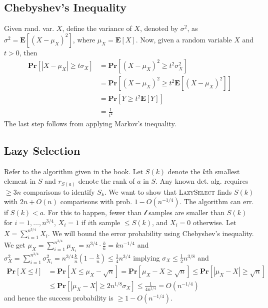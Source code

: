 \documentclass[12pt]{article}
\begin{document}
\subsection{Chebyshev's Inequality}
Given rand. var. $X$, define the variance of $X$, denoted by $\sigma^2$, as $\sigma^2 = \mathbf{E}\left[ \left( X - \mu_X \right)^2 \right]$, where $\mu_X = \mathbf{E} \left[ X \right]$. Now, given a random variable $X$ and $t > 0$, then
\begin{align*}
\mathbf{Pr}\left[ \left| X-\mu_X \right| \geq t\sigma_X \right] &= \mathbf{Pr}\left[ \left( X-\mu_X \right)^2 \geq t^2\sigma_X^2 \right] \\
&= \mathbf{Pr}\left[ \left( X-\mu_X \right)^2 \geq t^2 \mathbf{E}\left[\left( X-\mu_X \right)^2\right] \right] \\
&= \mathbf{Pr}\left[ Y \geq t^2\mathbf{E}\left[Y\right] \right] \\
&= \frac{1}{t^2}
\end{align*}
The last step follows from applying Markov's inequality.

\subsection{Lazy Selection}
Refer to the algorithm given in the book. Let $S(k)$ denote the $k$th smallest element in $S$ and $r_{S(a)}$ denote the rank of $a$ in $S$. Any known det. alg. requires $\geq 3n$ comparisons to identify $S_{k}$. We want to show that \textsc{LazySelect} finds $S(k)$ with $2n + O(n)$ comparisons with prob. $1-O(n^{-1/4})$. The algorithm can err. if $S(k) < a$. For this to happen, fewer than $\mathcal{l}$ samples are smaller than $S(k)$ for $i=1, \hdots, n^{3/4}$, $X_i=1$ if $i$th sample $\leq S(k)$, and $X_i = 0$ otherwise. Let $X=\sum^{n^{3/4}}_{i=1} X_i$. We will bound the error probability using Chebyshev's inequality. We get $\mu_X = \sum^{n^{3/4}}_{i=1} \mu_{X_i} = n^{3/4}\cdot \frac{k}{n}=kn^{-1/4}$ and $\sigma_X^2 = \sum^{n^{3/4}}_{i=1} \sigma^2_{X_i} = n^{3/4}\frac{k}{n}\left( 1-\frac{k}{n} \right) \leq \frac{1}{4}n^{3/4}$ implying $\sigma_X \leq \frac{1}{2}n^{3/8}$ and
\begin{align*}
\mathbf{Pr} \left[ X \leq l \right] &= \mathbf{Pr} \left[ X \leq \mu_X - \sqrt{n} \right] = \mathbf{Pr} \left[ \mu_X - X \geq \sqrt{n} \right] \leq \mathbf{Pr} \left[ \left| \mu_X - X \right| \geq \sqrt{n} \right] \\
&\leq \mathbf{Pr} \left[ \left| \mu_X - X \right| \geq 2n^{1/8}\sigma_X \right] \leq \frac{1}{4n^{1/4}} = O(n^{-1/4})
\end{align*}
and hence the success probability is $\geq 1-O(n^{-1/4})$.
\end{document}

